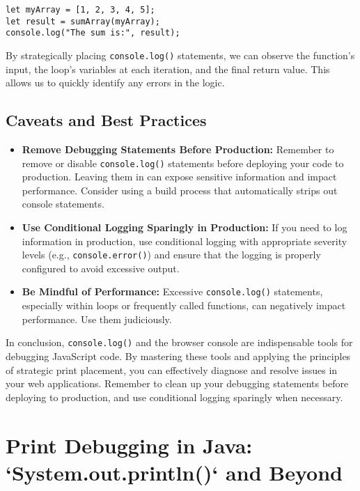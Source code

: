 \documentclass{article}
\begin{document}
{{{{\begin{verbatim}
let myArray = [1, 2, 3, 4, 5];
let result = sumArray(myArray);
console.log("The sum is:", result);
\end{verbatim}

By strategically placing \texttt{console.log()} statements, we can observe the function's input, the loop's variables at each iteration, and the final return value. This allows us to quickly identify any errors in the logic.

\subsection*{Caveats and Best Practices}

\begin{itemize}
    \item \textbf{Remove Debugging Statements Before Production:} Remember to remove or disable \texttt{console.log()} statements before deploying your code to production. Leaving them in can expose sensitive information and impact performance.  Consider using a build process that automatically strips out console statements.
    \item \textbf{Use Conditional Logging Sparingly in Production:} If you need to log information in production, use conditional logging with appropriate severity levels (e.g., \texttt{console.error()}) and ensure that the logging is properly configured to avoid excessive output.
    \item \textbf{Be Mindful of Performance:} Excessive \texttt{console.log()} statements, especially within loops or frequently called functions, can negatively impact performance. Use them judiciously.
\end{itemize}

In conclusion, \texttt{console.log()} and the browser console are indispensable tools for debugging JavaScript code. By mastering these tools and applying the principles of strategic print placement, you can effectively diagnose and resolve issues in your web applications. Remember to clean up your debugging statements before deploying to production, and use conditional logging sparingly when necessary.

\newpage

\section*{Print Debugging in Java: `System.out.println()` and Beyond} %
\label{chapter-9-3-Print_Debugging_in_Java___System.out.pri}

}}}}
\end{document}
